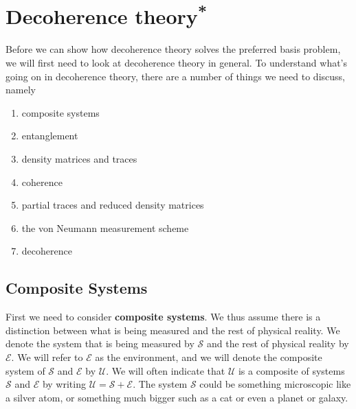   
     

      
    \section{Decoherence theory\label{decotheory}\textsuperscript{*}\protect\footnotemark}\renewcommand{\thefootnote}{\fnsymbol{footnote}}\renewcommand*{\thefootnote}{\arabic{footnote}}Before we can show how decoherence theory solves the preferred basis problem, we will first need to look at decoherence theory in general. To understand what's going on in decoherence theory, there are a number of things we need to discuss, namely
    \begin{enumerate}[noitemsep, nosep, topsep=0pt]
    \item composite systems
    \item entanglement
    \item density matrices and traces 
    \item coherence
    \item partial traces and reduced density matrices
    \item the von Neumann measurement scheme
    \item decoherence
    \end{enumerate}
    \subsection{Composite Systems} First we need to consider \textbf{composite systems}. We thus assume there is a distinction between what is being measured and the rest of physical reality. We denote the system that is being measured by $\mathcal{S}$ and the rest of physical reality by $\mathcal{E}$. We will refer to $\mathcal{E}$ as the environment, and we will denote the composite system of $\mathcal{S}$ and $\mathcal{E}$ by $\mathcal{U}$. We will often indicate that $\mathcal{U}$ is a composite of systems $\mathcal{S}$ and $\mathcal{E}$ by writing $\mathcal{U}=\mathcal{S}+\mathcal{E}$. The system $\mathcal{S}$ could be something microscopic like a silver atom, or something much bigger such as a cat or even a planet or galaxy.
    
